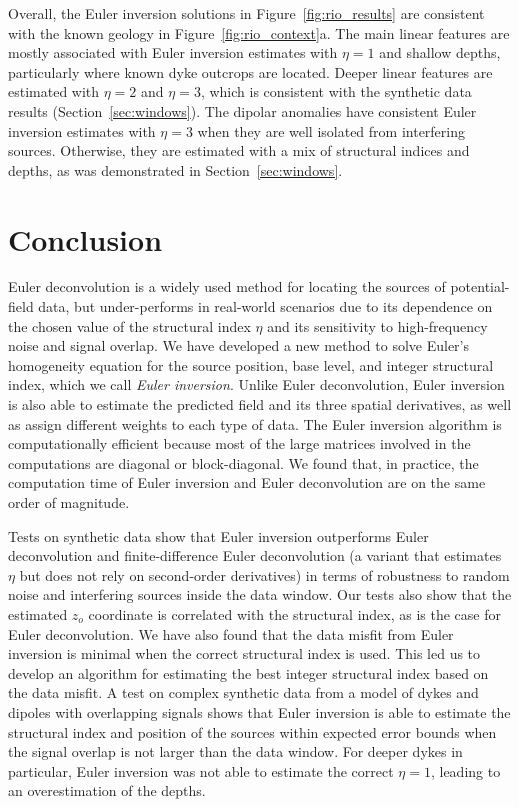 Overall, the Euler inversion solutions in Figure~\ref{fig:rio_results} are consistent with the known geology in Figure~\ref{fig:rio_context}a.
The main linear features are mostly associated with Euler inversion estimates with $\eta=1$ and shallow depths, particularly where known dyke outcrops are located.
Deeper linear features are estimated with $\eta=2$ and $\eta=3$, which is consistent with the synthetic data results (Section~\ref{sec:windows}).
The dipolar anomalies have consistent Euler inversion estimates with $\eta=3$ when they are well isolated from interfering sources.
Otherwise, they are estimated with a mix of structural indices and depths, as was demonstrated in Section~\ref{sec:windows}.

\section{Conclusion}

Euler deconvolution is a widely used method for locating the sources of potential-field data, but under-performs in real-world scenarios due to its dependence on the chosen value of the structural index $\eta$ and its sensitivity to high-frequency noise and signal overlap.
We have developed a new method to solve Euler's homogeneity equation for the source position, base level, and integer structural index, which we call \textit{Euler inversion}.
Unlike Euler deconvolution, Euler inversion is also able to estimate the predicted field and its three spatial derivatives, as well as assign different weights to each type of data.
The Euler inversion algorithm is computationally efficient because most of the large matrices involved in the computations are diagonal or block-diagonal.
We found that, in practice, the computation time of Euler inversion and Euler deconvolution are on the same order of magnitude.

Tests on synthetic data show that Euler inversion outperforms Euler deconvolution and finite-difference Euler deconvolution (a variant that estimates $\eta$ but does not rely on second-order derivatives) in terms of robustness to random noise and interfering sources inside the data window.
Our tests also show that the estimated $z_o$ coordinate is correlated with the structural index, as is the case for Euler deconvolution.
We have also found that the data misfit from Euler inversion is minimal when the correct structural index is used.
This led us to develop an algorithm for estimating the best integer structural index based on the data misfit.
A test on complex synthetic data from a model of dykes and dipoles with overlapping signals shows that Euler inversion is able to estimate the structural index and position of the sources within expected error bounds when the signal overlap is not larger than the data window.
For deeper dykes in particular, Euler inversion was not able to estimate the correct $\eta=1$, leading to an overestimation of the depths.

